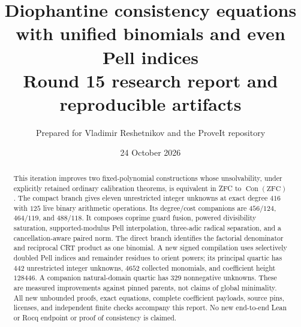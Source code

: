 \documentclass[11pt,a4paper]{article}
\title{Diophantine consistency equations with unified binomials and even Pell indices\\[8pt]\large Round 15 research report and reproducible artifacts}
\author{Prepared for Vladimir Reshetnikov and the ProveIt repository}
\date{24 October 2026}
\newcommand{\Con}{\operatorname{Con}}
\theoremstyle{remark}\newtheorem{remark}[theorem]{Remark}
\begin{document}
\maketitle
\begin{abstract}
This iteration improves two fixed-polynomial constructions whose unsolvability, under explicitly retained ordinary calibration theorems, is equivalent in ZFC to $\Con(\mathrm{ZFC})$. The compact branch gives eleven unrestricted integer unknowns at exact degree $416$ with $125$ live binary arithmetic operations. Its degree/cost companions are $456/124$, $464/119$, and $488/118$. It composes coprime guard fusion, powered divisibility saturation, supported-modulus Pell interpolation, three-adic radical separation, and a cancellation-aware paired norm. The direct branch identifies the factorial denominator and reciprocal CRT product as one binomial. A new signed compilation uses selectively doubled Pell indices and remainder residues to orient powers; its principal quartic has $442$ unrestricted integer unknowns, $4652$ collected monomials, and coefficient height $128446$. A companion natural-domain quartic has $329$ nonnegative unknowns. These are measured improvements against pinned parents, not claims of global minimality. All new unbounded proofs, exact equations, complete coefficient payloads, source pins, licenses, and independent finite checks accompany this report. No new end-to-end Lean or Rocq endpoint or proof of consistency is claimed.
\end{abstract}
\clearpage
\tableofcontents
\clearpage











\end{document}
